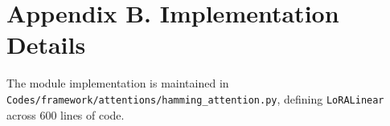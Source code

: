 \section*{Appendix B. Implementation Details}
The module implementation is maintained in \texttt{Codes/framework/attentions/hamming\_attention.py}, defining \texttt{LoRALinear} across 600 lines of code.
